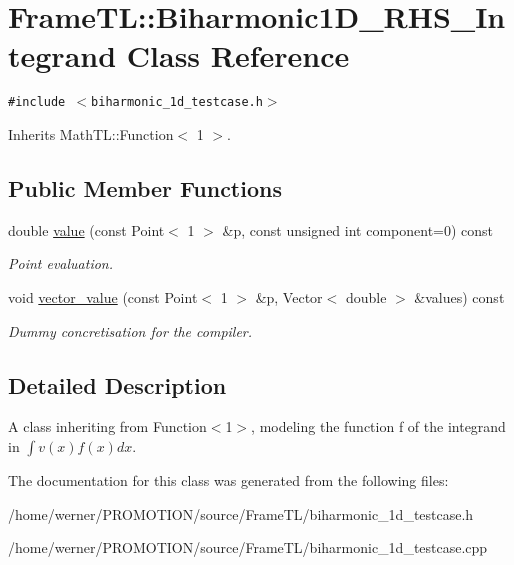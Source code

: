 \hypertarget{classFrameTL_1_1Biharmonic1D__RHS__Integrand}{
\section{FrameTL::Biharmonic1D\_\-RHS\_\-Integrand Class Reference}
\label{classFrameTL_1_1Biharmonic1D__RHS__Integrand}
}
{\tt \#include $<$biharmonic\_\-1d\_\-testcase.h$>$}

Inherits MathTL::Function$<$ 1 $>$.

\subsection*{Public Member Functions}
\begin{CompactItemize}
\item 
\hypertarget{classFrameTL_1_1Biharmonic1D__RHS__Integrand_174357ca2c524475a0d66b98375a7ccb}{
double \hyperlink{classFrameTL_1_1Biharmonic1D__RHS__Integrand_174357ca2c524475a0d66b98375a7ccb}{value} (const Point$<$ 1 $>$ \&p, const unsigned int component=0) const }
\label{classFrameTL_1_1Biharmonic1D__RHS__Integrand_174357ca2c524475a0d66b98375a7ccb}

\begin{CompactList}\small\item\em Point evaluation. \item\end{CompactList}\item 
\hypertarget{classFrameTL_1_1Biharmonic1D__RHS__Integrand_6de019d91743507faf5f828c39e0327b}{
void \hyperlink{classFrameTL_1_1Biharmonic1D__RHS__Integrand_6de019d91743507faf5f828c39e0327b}{vector\_\-value} (const Point$<$ 1 $>$ \&p, Vector$<$ double $>$ \&values) const }
\label{classFrameTL_1_1Biharmonic1D__RHS__Integrand_6de019d91743507faf5f828c39e0327b}

\begin{CompactList}\small\item\em Dummy concretisation for the compiler. \item\end{CompactList}\end{CompactItemize}


\subsection{Detailed Description}
A class inheriting from Function$<$1$>$, modeling the function f of the integrand in $\int v(x) f(x) dx$. 

The documentation for this class was generated from the following files:\begin{CompactItemize}
\item 
/home/werner/PROMOTION/source/FrameTL/biharmonic\_\-1d\_\-testcase.h\item 
/home/werner/PROMOTION/source/FrameTL/biharmonic\_\-1d\_\-testcase.cpp\end{CompactItemize}
